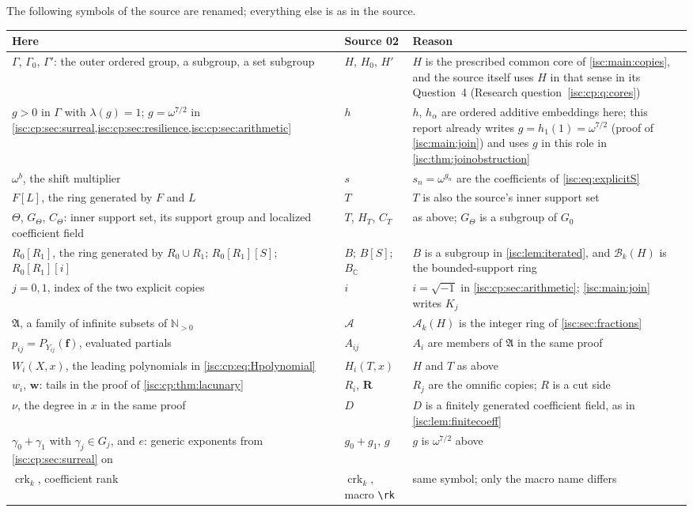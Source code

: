 \documentclass[11pt,letterpaper]{article}
\theoremstyle{definition}
\theoremstyle{remark}
\newcommand{\C}{\mathbb C}
\newcommand{\N}{\mathbb N}
\newcommand{\A}[2]{\mathcal A_{#1}(#2)}
\newcommand{\B}[2]{\mathcal B_{#1}(#2)}
\newcommand{\crk}{\operatorname{crk}}%
\numberwithin{equation}{section}
\begin{document}
The following symbols of the source are renamed; everything else is as in
the source.
\begin{center}\small
\begin{longtable}{@{}p{}p{}p{}@{}}
\toprule
Here & Source 02 & Reason\\
\midrule
\endhead
$\Gamma$, $\Gamma_0$, $\Gamma'$: the outer ordered group, a subgroup, a
set subgroup & $H$, $H_0$, $H'$ & $H$ is the prescribed common core of
\cref{isc:main:copies}, and the source itself uses $H$ in that sense in its
Question~4 (Research question~\ref{isc:cp:q:cores})\\
$g>0$ in $\Gamma$ with $\lambda(g)=1$; $g=\omega^{7/2}$ in
\cref{isc:cp:sec:surreal,isc:cp:sec:resilience,isc:cp:sec:arithmetic} & $h$
& $h$, $h_\alpha$ are ordered additive embeddings here; this report already
writes $g=h_1(1)=\omega^{7/2}$ (proof of \cref{isc:main:join}) and uses $g$
in this role in \cref{isc:thm:joinobstruction}\\
$\omega^b$, the shift multiplier & $s$ & $s_n=\omega^{g_n}$ are the
coefficients of \eqref{isc:eq:explicitS}\\
$F[L]$, the ring generated by $F$ and $L$ & $T$ & $T$ is also the source's
inner support set\\
$\Theta$, $G_\Theta$, $C_\Theta$: inner support set, its support group and
localized coefficient field & $T$, $H_T$, $C_T$ & as above; $G_\Theta$ is a
subgroup of $G_0$\\
$R_0[R_1]$, the ring generated by $R_0\cup R_1$; $R_0[R_1][S]$;
$R_0[R_1][i]$ & $B$; $B[S]$; $B_{\C}$ & $B$ is a subgroup in
\cref{isc:lem:iterated}, and $\B{k}{H}$ is the bounded-support ring\\
$j=0,1$, index of the two explicit copies & $i$ & $i=\sqrt{-1}$ in
\cref{isc:cp:sec:arithmetic}; \cref{isc:main:join} writes $K_j$\\
$\mathfrak A$, a family of infinite subsets of $\N_{>0}$ & $\mathcal A$ &
$\A{k}{H}$ is the integer ring of \cref{isc:sec:fractions}\\
$p_{ij}=P_{Y_{ij}}(\mathbf f)$, evaluated partials & $A_{ij}$ & $A_i$ are
members of $\mathfrak A$ in the same proof\\
$W_i(X,x)$, the leading polynomials in \eqref{isc:cp:eq:Hpolynomial} & $H_i(T,x)$ &
$H$ and $T$ as above\\
$w_i$, $\mathbf w$: tails in the proof of \cref{isc:cp:thm:lacunary} & $R_i$,
$\mathbf R$ & $R_j$ are the omnific copies; $R$ is a cut side\\
$\nu$, the degree in $x$ in the same proof & $D$ & $D$ is a finitely
generated coefficient field, as in \cref{isc:lem:finitecoeff}\\
$\gamma_0+\gamma_1$ with $\gamma_j\in G_j$, and $e$: generic
exponents from \cref{isc:cp:sec:surreal} on & $g_0+g_1$, $g$ & $g$ is
$\omega^{7/2}$ above\\
$\crk_k$, coefficient rank & $\operatorname{crk}_k$, macro \texttt{\textbackslash rk} &
same symbol; only the macro name differs\\
\bottomrule
\end{longtable}
\end{center}
\end{document}
